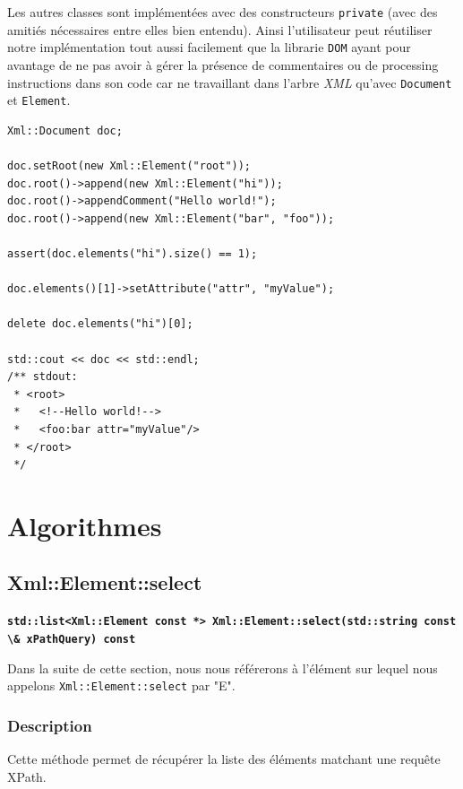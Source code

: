    Les autres classes sont implémentées avec des constructeurs \lstinline$private$ (avec des amitiés nécessaires entre elles bien entendu). Ainsi l'utilisateur peut réutiliser notre implémentation tout aussi facilement que la librarie \lstinline$DOM$ ayant pour avantage de ne pas avoir à gérer la présence de commentaires ou de processing instructions dans son code car ne travaillant dans l'arbre \textit{XML} qu'avec \lstinline$Document$ et \lstinline$Element$.
    \\
    \begin{lstlisting}[frame=single]
Xml::Document doc;

doc.setRoot(new Xml::Element("root"));
doc.root()->append(new Xml::Element("hi"));
doc.root()->appendComment("Hello world!");
doc.root()->append(new Xml::Element("bar", "foo"));

assert(doc.elements("hi").size() == 1);

doc.elements()[1]->setAttribute("attr", "myValue");

delete doc.elements("hi")[0];

std::cout << doc << std::endl;
/** stdout:
 * <root>
 *   <!--Hello world!-->
 *   <foo:bar attr="myValue"/>
 * </root>
 */
    \end{lstlisting}


\section{Algorithmes}

    \subsection{Xml::Element::select}

    \textbf{\lstinline$std::list<Xml::Element const *> Xml::Element::select(std::string const \& xPathQuery) const$}

    Dans la suite de cette section, nous nous référerons à l'élément sur lequel nous appelons \lstinline$Xml::Element::select$ par "E".

    \subsubsection{Description}
    Cette méthode permet de récupérer la liste des éléments matchant une requête XPath.

